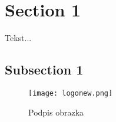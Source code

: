 %
%


\section{Section 1}
	Tekst...
\subsection{Subsection 1}


	\begin{figure}[th!]		
		\texttt{[image: logonew.png]}		
		\caption{Podpis obrazka}
        \label{particlesSM}
	\end{figure}

